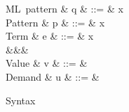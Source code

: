\begin{figure}
\begin{syntaxfig}
\mbox{ML pattern}
&
q
&
::=
&
x
\mid
\exUnit
\mid
{}
\mid
{}
\mid
{}
\\[1mm]
\mbox{Pattern}
&
p
&
::=
&
\bot
\mid
x
\mid
\exUnit
\mid
{}
\mid
{}
\\[1mm]
\mbox{Term}
&
e
&
::=
&
x
\mid
\exUnit
\mid
{}
\mid
{}
\mid
{}
\mid
{}
\mid
{}
\mid
\\
&&&
\mid
{}
\mid
{}
\mid
\\[1mm]
\mbox{Value}
&
v
&
::=
&
\mid
\exUnit
\mid
{}
\mid
{}
\mid
{}
\mid
{}
\\[1mm]
\mbox{Demand}
&
u
&
::=
&
\bot
\mid
\exUnit
\mid
{}
\mid
{}
\mid
\exLambdaDemand
\end{syntaxfig}
\caption{Syntax}
\label{fig:syntax:values}
\end{figure}
